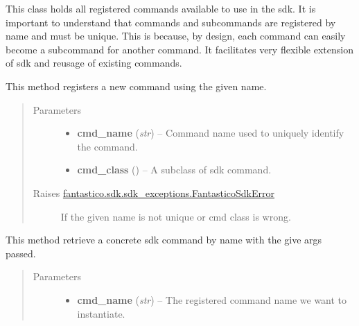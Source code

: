 \documentclass[letterpaper,10pt,english]{sphinxmanual}
\begin{document}

\begin{fulllineitems}
\label{features/sdk:fantastico.sdk.sdk_core.SdkCommandsRegistry}
This class holds all registered commands available to use in the sdk. It is important to understand that commands and
subcommands are registered by name and must be unique. This is because, by design, each command can easily become a
subcommand for another command. It facilitates very flexible extension of sdk and reusage of existing commands.

\begin{fulllineitems}
\label{features/sdk:fantastico.sdk.sdk_core.SdkCommandsRegistry.add_command}
This method registers a new command using the given name.
\begin{quote}\begin{description}
\item[{Parameters}] \leavevmode\begin{itemize}
\item {} 
\textbf{cmd\_name} (\emph{str}) -- Command name used to uniquely identify the command.

\item {} 
\textbf{cmd\_class} ({\hyperref[features/sdk:fantastico.sdk.sdk_core.SdkCommand]{}}) -- A subclass of sdk command.

\end{itemize}

\item[{Raises {\hyperref[features/sdk:fantastico.sdk.sdk_exceptions.FantasticoSdkError]{fantastico.sdk.sdk\_exceptions.FantasticoSdkError}}}] \leavevmode
If the given name is not unique or cmd class is wrong.

\end{description}\end{quote}

\end{fulllineitems}


\begin{fulllineitems}
\label{features/sdk:fantastico.sdk.sdk_core.SdkCommandsRegistry.get_command}
This method retrieve a concrete sdk command by name with the give args passed.
\begin{quote}\begin{description}
\item[{Parameters}] \leavevmode\begin{itemize}
\item {} 
\textbf{cmd\_name} (\emph{str}) -- The registered command name we want to instantiate.


\end{itemize}
\end{description}
\end{quote}
\end{fulllineitems}
\end{fulllineitems}
\end{document}
